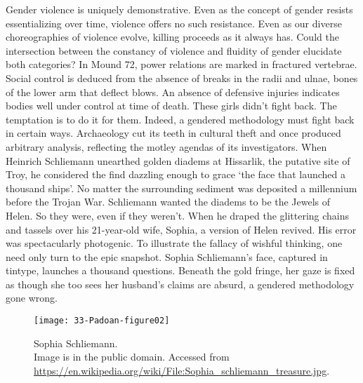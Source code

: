 Gender violence is uniquely demonstrative. Even as the concept of gender resists essentializing over time, violence offers no such resistance. Even as our diverse choreographies of violence evolve, killing proceeds as it always has. Could the intersection between the constancy of violence and fluidity of gender elucidate both categories? In Mound 72, power relations are marked in fractured vertebrae. Social control is deduced from the absence of breaks in the radii and ulnae, bones of the lower arm that deflect blows. An absence of defensive injuries indicates bodies well under control at time of death. These girls didn't fight back. The temptation is to do it for them. Indeed, a gendered methodology must fight back in certain ways. Archaeology cut its teeth in cultural theft and once produced arbitrary analysis, reflecting the motley agendas of its investigators. When Heinrich Schliemann unearthed golden diadems at Hissarlik, the putative site of Troy, he considered the find dazzling enough to grace \enquote*{the face that launched a thousand ships}. 
No matter the surrounding sediment was deposited a millennium before the Trojan War. Schliemann wanted the diadems to be the Jewels of Helen. So they were, even if they weren't. When he draped the glittering chains and tassels over his 21-year-old wife, Sophia, a version of Helen revived. His error was spectacularly photogenic. To illustrate the fallacy of wishful thinking, one need only turn to the epic snapshot. Sophia Schliemann’s face, captured in tintype, launches a thousand questions. Beneath the gold fringe, her gaze is fixed as though she too sees her husband's claims are absurd, a gendered methodology gone wrong. 
\begin{wrapfigure}[18]{O}[3cm]{0.5\textwidth} 	
	\centering
	\texttt{[image: 33-Padoan-figure02]}
	\caption{Sophia Schliemann.
		 {\normalfont\scriptsize \\ Image is in the public domain. Accessed from  \url{https://en.wikipedia.org/wiki/File:Sophia_schliemann_treasure.jpg}.}
		}
	\label{fig:33-Padoan-figure01}
\end{wrapfigure}

